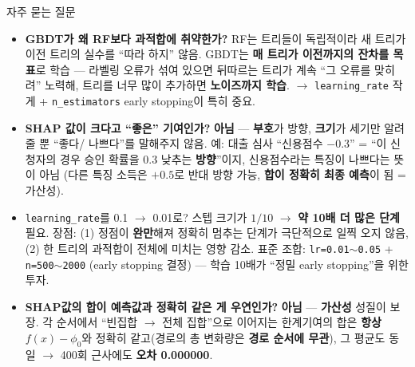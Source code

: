 \documentclass[aspectratio=169,11pt]{beamer}
\begin{document}
\begin{frame}{자주 묻는 질문}
  \small
  \begin{itemize}
    \item \textbf{GBDT가 왜 RF보다 과적합에 취약한가?} RF는 트리들이
      독립적이라 새 트리가 이전 트리의 실수를 ``따라 하지'' 않음. GBDT는
      \textbf{매 트리가 이전까지의 잔차를 목표}로 학습 — 라벨링 오류가
      섞여 있으면 뒤따르는 트리가 계속 ``그 오류를 맞히려'' 노력해,
      트리를 너무 많이 추가하면 \textbf{노이즈까지 학습}.
      $\to$ \texttt{learning\_rate} 작게 + \texttt{n\_estimators}
      early stopping이 특히 중요.
    \item \textbf{SHAP 값이 크다고 ``좋은'' 기여인가?} \textbf{아님} —
      \textbf{부호}가 방향, \textbf{크기}가 세기만 알려줄 뿐 ``좋다/
      나쁘다''를 말해주지 않음. 예: 대출 심사 ``신용점수 $-0.3$'' =
      ``이 신청자의 경우 승인 확률을 0.3 낮추는 \textbf{방향}''이지,
      신용점수라는 특징이 나쁘다는 뜻이 아님 (다른 특징 소득은 $+0.5$로
      반대 방향 가능, \textbf{합이 정확히 최종 예측}이 됨 = 가산성).
    \item \texttt{learning\_rate}를 0.1 $\to$ 0.01로? 스텝 크기가
      $1/10$ $\to$ \textbf{약 10배 더 많은 단계} 필요. 장점:
      (1) 정점이 \textbf{완만}해져 정확히 멈추는 단계가 극단적으로
      일찍 오지 않음, (2) 한 트리의 과적합이 전체에 미치는 영향 감소.
      표준 조합: \texttt{lr=0.01$\sim$0.05} + \texttt{n=500$\sim$2000}
      (early stopping 결정) — 학습 10배가 ``정밀 early stopping''을 위한
      투자.
    \item \textbf{SHAP값의 합이 예측값과 정확히 같은 게 우연인가?}
      \textbf{아님} — \textbf{가산성} 성질이 보장. 각 순서에서
      ``빈집합 $\to$ 전체 집합''으로 이어지는 한계기여의 합은
      \textbf{항상} $f(x) - \phi_0$와 정확히 같고(경로의 총 변화량은
      \textbf{경로 순서에 무관}), 그 평균도 동일 $\to$ 400회 근사에도
      \textbf{오차 0.000000}.
  \end{itemize}
\end{frame}
\end{document}
